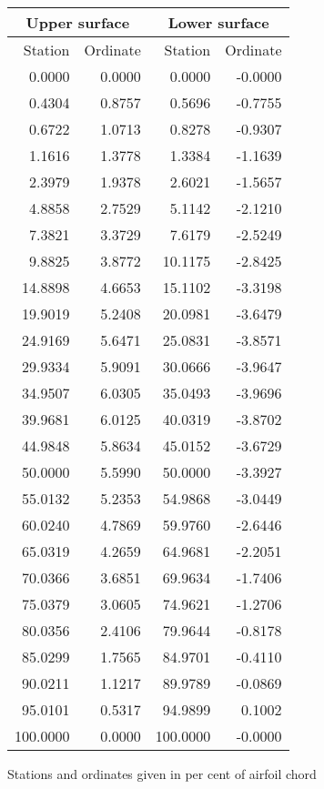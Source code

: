 \documentclass[11pt]{book}
\begin{document}
 \hspace{4mm}
 \begin{tabular}{|r|r|r|r|} \hline 
 \multicolumn{2}{|c|}{Upper surface} & \multicolumn{2}{|c|}{Lower surface} \\
 \hline
 Station & Ordinate & Station & Ordinate \\
 \hline
0.0000 & 0.0000 & 0.0000 & -0.0000 \\
0.4304 & 0.8757 & 0.5696 & -0.7755 \\
0.6722 & 1.0713 & 0.8278 & -0.9307 \\
1.1616 & 1.3778 & 1.3384 & -1.1639 \\
2.3979 & 1.9378 & 2.6021 & -1.5657 \\
4.8858 & 2.7529 & 5.1142 & -2.1210 \\
7.3821 & 3.3729 & 7.6179 & -2.5249 \\
9.8825 & 3.8772 & 10.1175 & -2.8425 \\
14.8898 & 4.6653 & 15.1102 & -3.3198 \\
19.9019 & 5.2408 & 20.0981 & -3.6479 \\
24.9169 & 5.6471 & 25.0831 & -3.8571 \\
29.9334 & 5.9091 & 30.0666 & -3.9647 \\
34.9507 & 6.0305 & 35.0493 & -3.9696 \\
39.9681 & 6.0125 & 40.0319 & -3.8702 \\
44.9848 & 5.8634 & 45.0152 & -3.6729 \\
50.0000 & 5.5990 & 50.0000 & -3.3927 \\
55.0132 & 5.2353 & 54.9868 & -3.0449 \\
60.0240 & 4.7869 & 59.9760 & -2.6446 \\
65.0319 & 4.2659 & 64.9681 & -2.2051 \\
70.0366 & 3.6851 & 69.9634 & -1.7406 \\
75.0379 & 3.0605 & 74.9621 & -1.2706 \\
80.0356 & 2.4106 & 79.9644 & -0.8178 \\
85.0299 & 1.7565 & 84.9701 & -0.4110 \\
90.0211 & 1.1217 & 89.9789 & -0.0869 \\
95.0101 & 0.5317 & 94.9899 & 0.1002 \\
100.0000 & 0.0000 & 100.0000 & -0.0000 \\
 \hline 
 \end{tabular}
 \vspace{8mm}

Stations and ordinates given in per cent of airfoil chord
\end{document}
